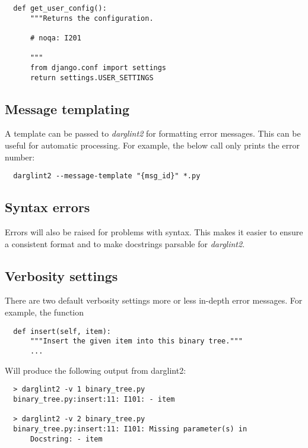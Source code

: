 \documentclass[landscape]{sciposter}
\begin{document}
\begin{multicols}{4}
\begin{verbatim}
  def get_user_config():
      """Returns the configuration.

      # noqa: I201

      """
      from django.conf import settings
      return settings.USER_SETTINGS
\end{verbatim}

        \subsection{Message templating}
            A template can be passed to \textit{darglint2} for formatting error
            messages.  This can be useful for automatic processing.  For
            example, the below call only prints the error number:

\begin{verbatim}
  darglint2 --message-template "{msg_id}" *.py
\end{verbatim}

        \subsection{Syntax errors}
            Errors will also be raised for problems with syntax.  This
            makes it easier to ensure a consistent format and to make
            docstrings parsable for \textit{darglint2}.

        \subsection{Verbosity settings}
            There are two default verbosity settings more or less in-depth
            error messages.  For example, the function
            \begin{verbatim}
  def insert(self, item):
      """Insert the given item into this binary tree."""
      ...
            \end{verbatim}

            Will produce the following output from darglint2:

            \begin{verbatim}
  > darglint2 -v 1 binary_tree.py
  binary_tree.py:insert:11: I101: - item

  > darglint2 -v 2 binary_tree.py
  binary_tree.py:insert:11: I101: Missing parameter(s) in
      Docstring: - item

            \end{verbatim}



\end{multicols}
\end{document}
